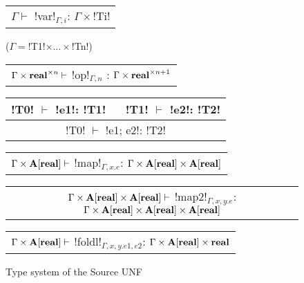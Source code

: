 \begin{figure*}[tb]
    \centering
    \begin{tabular}{c} 
    \\\hline
    $\Gamma \vdash$ !var!$_{\Gamma,i}$: $\Gamma\times$!Ti!
    \end{tabular}($\Gamma=$!T1!$\times\ldots\times$!Tn!)
    \hspace{0.5cm}
    \begin{tabular}{c}
        \\\hline
        $\Gamma\times\mathbf{real}^{\times n} \vdash$ !op!$_{\Gamma,n}$ : $\Gamma\times\mathbf{real}^{\times n+1}$
    \end{tabular}

    \begin{tabular}{c}
    !T0! $\vdash$ !e1!: !T1! $\quad$ !T1! $\vdash$ !e2!: !T2! \\\hline
    !T0! $\vdash$ !e1; e2!: !T2!
    \end{tabular}
    \hspace{0.5cm}
    \begin{tabular}{c}
        \\\hline  
        $\Gamma \times \mathbf{A}[\mathbf{real}] \vdash$ !map!$_{\Gamma, x.e}$: $\Gamma \times \mathbf{A}[\mathbf{real}] \times \mathbf{A}[\mathbf{real}]$
    \end{tabular}

    \begin{tabular}{c}
        \\\hline  
        $\Gamma \times \mathbf{A}[\mathbf{real}] \times \mathbf{A}[\mathbf{real}] \vdash$ !map2!$_{\Gamma, x,y.e}$: $\Gamma \times \mathbf{A}[\mathbf{real}] \times \mathbf{A}[\mathbf{real}] \times \mathbf{A}[\mathbf{real}]$
    \end{tabular}

    \begin{tabular}{c}
        \\\hline  
        $\Gamma \times \mathbf{A}[\mathbf{real}] \vdash$ !foldl!$_{\Gamma, x,y.e1, e2}$: $\Gamma \times \mathbf{A}[\mathbf{real}] \times \mathbf{real}$
    \end{tabular}
    \vspace{-0.2cm}
    \caption{Type system of the Source UNF}
    \vspace{-0.4cm}
    \label{fig:source_unf_typesystem}
    \end{figure*}